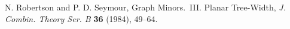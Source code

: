 \documentclass[11pt]{article}
\begin{document}
{\raggedright\noindent N. Robertson and P. D. Seymour, Graph Minors.\ III. Planar Tree-Width, \textit{J. Combin. Theory Ser. B} \textbf{36} (1984), 49--64.
\par}\bigskip

\clearpage
















\end{document}
